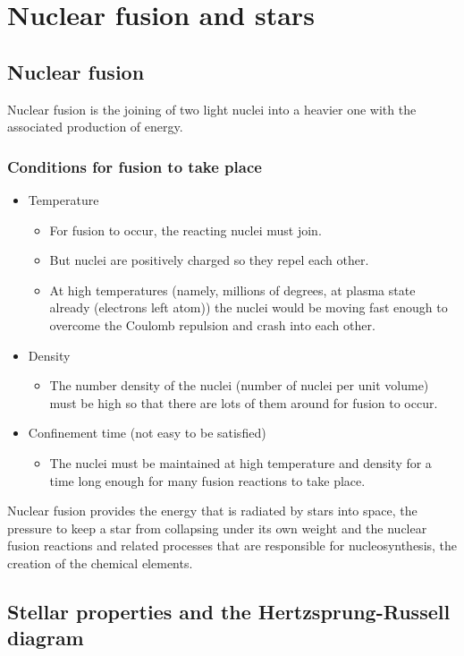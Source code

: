\section{Nuclear fusion and stars}
\subsection{Nuclear fusion}
Nuclear fusion is the joining of two light nuclei into a heavier one with the associated production of energy. 
\subsubsection*{Conditions for fusion to take place}
\begin{itemize}
  \item Temperature
  \begin{itemize}
    \item For fusion to occur, the reacting nuclei must join. 
    \item But nuclei are positively charged so they repel each other.
    \item At high temperatures (namely, millions of degrees, at plasma state already (electrons left atom)) the nuclei would be moving fast enough to overcome the Coulomb repulsion and crash into each other.
  \end{itemize}
  \item Density
  \begin{itemize}
    \item The number density of the nuclei (number of nuclei per unit volume) must be high so that there are lots of them around for fusion to occur.
  \end{itemize}
  \item Confinement time (not easy to be satisfied)
  \begin{itemize}
    \item The nuclei must be maintained at high temperature and density for a time long enough for many fusion reactions to take place.
  \end{itemize}
\end{itemize}
Nuclear fusion provides the energy that is radiated by stars into space, the pressure to keep a star from collapsing under its own weight and the nuclear fusion reactions and related processes that are responsible for nucleosynthesis, the creation of the chemical elements. 
\subsection{Stellar properties and the Hertzsprung-Russell diagram}

